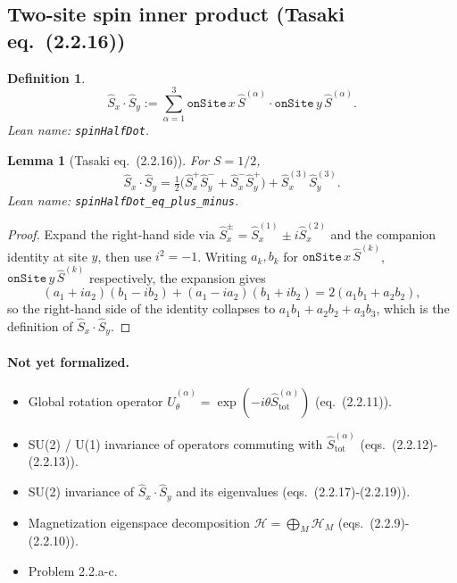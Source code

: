 \documentclass[a4paper,11pt]{article}
\newtheorem{lemma}[theorem]{Lemma}
\newtheorem{definition}[theorem]{Definition}
\begin{document}
\subsection{Two-site spin inner product (Tasaki eq.~(2.2.16))}

\begin{definition}
\[
  \hat S_x \cdot \hat S_y
    := \sum_{\alpha = 1}^{3}
       \texttt{onSite}\,x\,\hat S^{(\alpha)}
       \cdot
       \texttt{onSite}\,y\,\hat S^{(\alpha)}.
\]
Lean name: \texttt{spinHalfDot}.
\end{definition}

\begin{lemma}[Tasaki eq.~(2.2.16)]
For $S = 1/2$,
\[
  \hat S_x \cdot \hat S_y
    = \tfrac12 \bigl( \hat S_x^{+}\hat S_y^{-}
                    + \hat S_x^{-}\hat S_y^{+}\bigr)
      + \hat S_x^{(3)} \hat S_y^{(3)}.
\]
Lean name: \texttt{spinHalfDot\_eq\_plus\_minus}.
\end{lemma}

\begin{proof}
Expand the right-hand side via
$\hat S_x^{\pm} = \hat S_x^{(1)} \pm i\hat S_x^{(2)}$ and the companion
identity at site $y$, then use $i^2 = -1$. Writing $a_k, b_k$ for
$\texttt{onSite}\,x\,\hat S^{(k)}$, $\texttt{onSite}\,y\,\hat S^{(k)}$
respectively, the expansion gives
\[
  (a_1 + i a_2)(b_1 - i b_2) + (a_1 - i a_2)(b_1 + i b_2)
    = 2(a_1 b_1 + a_2 b_2),
\]
so the right-hand side of the identity collapses to
$a_1 b_1 + a_2 b_2 + a_3 b_3$, which is the definition of
$\hat S_x \cdot \hat S_y$.
\end{proof}

\paragraph{Not yet formalized.}
\begin{itemize}
  \item Global rotation operator
    $\hat U^{(\alpha)}_\theta = \exp(-i\theta \hat S_{\mathrm{tot}}^{(\alpha)})$
    (eq.~(2.2.11)).
  \item SU(2) / U(1) invariance of operators commuting with
    $\hat S_{\mathrm{tot}}^{(\alpha)}$ (eqs.~(2.2.12)-(2.2.13)).
  \item SU(2) invariance of $\hat S_x \cdot \hat S_y$ and its
    eigenvalues (eqs.~(2.2.17)-(2.2.19)).
  \item Magnetization eigenspace decomposition
    $\mathcal H = \bigoplus_M \mathcal H_M$ (eqs.~(2.2.9)-(2.2.10)).
  \item Problem 2.2.a-c.
\end{itemize}
\end{document}
